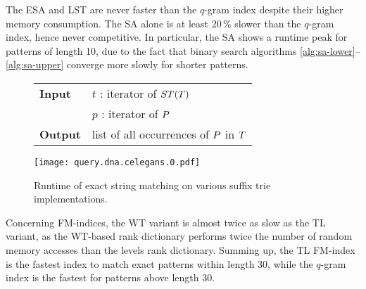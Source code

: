 The ESA and LST are never faster than the $q$-gram index despite their higher memory consumption.
The SA alone is at least 20\,\% slower than the $q$-gram index, hence never competitive.
In particular, the SA shows a runtime peak for patterns of length 10, due to the fact that binary search algorithms \ref{alg:sa-lower}--\ref{alg:sa-upper} converge more slowly for shorter patterns.

\begin{figure*}[t]
\begin{center}
\begin{minipage}[t]{.8\textwidth}
\begin{algorithm}[H]
\begin{tabular}{ll}
\textbf{Input}  & $t$ : iterator of $ST(T)$\\
				& $p$ : iterator of $P$\\
\textbf{Output} & list of all occurrences of $P$ in $T$\\
\end{tabular}
\begin{algorithmic}[1]
	\State \Report {}
		\State {}
\EndIf
\end{algorithmic}
\label{alg:st-exact}
\end{algorithm}
\end{minipage}
\end{center}
\end{figure*}

\begin{figure}[b]
\begin{center}
\caption[Exact string matching runtime]{Runtime of exact string matching on various suffix trie implementations.}
\label{fig:query-dna-exact}
\texttt{[image: query.dna.celegans.0.pdf]}
\end{center}
\end{figure}


Concerning FM-indices, the WT variant is almost twice as slow as the TL variant, as the WT-based rank dictionary performs twice the number of random memory accesses than the levels rank dictionary.
Summing up, the TL FM-index is the fastest index to match exact patterns within length 30, while the $q$-gram index is the fastest for patterns above length 30.

%

